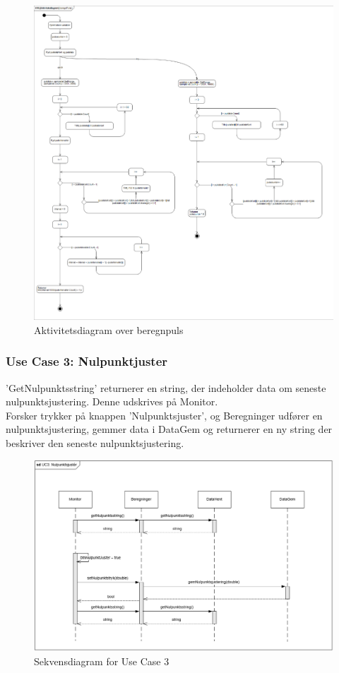 \begin{figure}[H]
	\centering
	\includegraphics[width=1\textwidth]{Figurer/aktivitetsdiagram_beregnPuls}
	\caption{Aktivitetsdiagram over beregnpuls}
\end{figure}


\subsubsection{Use Case 3: Nulpunktjuster}
'GetNulpunktsstring' returnerer en string, der indeholder data om seneste nulpunktsjustering. Denne udskrives på Monitor.\\
Forsker trykker på knappen 'Nulpunktsjuster', og Beregninger udfører en nulpunktsjustering, gemmer data i DataGem og returnerer en ny string der beskriver den seneste nulpunktsjustering.

\begin{figure}[H]
	\centering
	\includegraphics[width=1\textwidth]{Figurer/UC3_SD_SW}
	\caption{Sekvensdiagram for Use Case 3}
\end{figure}

